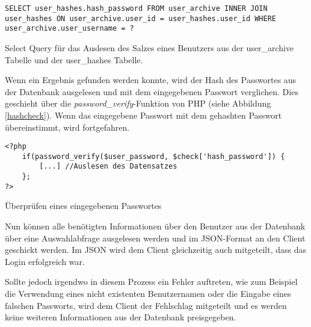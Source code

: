 \documentclass[../main.tex]{subfiles}
\begin{document}
	 \begin{code}
	 	\begin{center}
	 		\begin{verbatim}
SELECT user_hashes.hash_password FROM user_archive INNER JOIN user_hashes ON user_archive.user_id = user_hashes.user_id WHERE user_archive.user_username = ?
	 		\end{verbatim}
	 		\caption{Select Query für das Auslesen des Salzes eines Benutzers aus der user\_archive Tabelle und der user\_hashes Tabelle.}\label{SQL:SALT}
	 	\end{center}
	 \end{code}
 
 	Wenn ein Ergebnis gefunden werden konnte, wird der Hash des Passwortes aus der Datenbank ausgelesen und mit dem eingegebenen Passwort verglichen. Dies geschieht über die \emph{password\_verify}-Funktion von PHP (siehe Abbildung \ref{hashcheck}). Wenn das eingegebene Passwort mit dem gehashten Passwort übereinstimmt, wird fortgefahren. 
 	
\begin{code}
 	\begin{center}
 		\begin{verbatim}
<?php
	if(password_verify($user_password, $check['hash_password']) {
		[...] //Auslesen des Datensatzes
	};
?>
 			\end{verbatim}
 			\caption{Überprüfen eines eingegebenen Passwortes}\label{hashcheck}
 		\end{center}
 	\end{code}
 	
 	Nun können alle benötigten Informationen über den Benutzer aus der Datenbank über eine Auswahlabfrage ausgelesen werden und im JSON-Format an den Client geschickt werden. Im JSON wird dem Client gleichzeitig auch mitgeteilt, dass das Login erfolgreich war.
	 
	Sollte jedoch irgendwo in diesem Prozess ein Fehler auftreten, wie zum Beispiel die Verwendung eines nicht existenten Benutzernamen oder die Eingabe eines falschen Passworts, wird dem Client der Fehlschlag mitgeteilt und es werden keine weiteren Informationen aus der Datenbank preisgegeben.
	
	 
\end{document}
